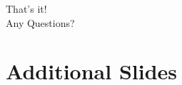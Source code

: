 \documentclass[shortpres,aspectratio=43]{beamer}
\newlength{\mylength}
\begin{document}
\begin{frame}
    \centering
    \Huge{That's it!}
    \\
    \vspace{4\mylength}
    \huge{Any Questions?}
\end{frame}


\section*{Additional Slides}

\end{document}
